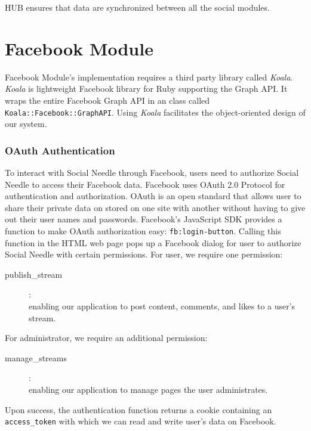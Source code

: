 HUB ensures that data are synchronized between all the social modules.


\section{Facebook Module} %
\label{sec:facebook_module}

Facebook Module's implementation requires a third party library called \emph{Koala}. \emph{Koala} is lightweight Facebook library for Ruby supporting the Graph API. It wraps the entire Facebook Graph API in an class called \texttt{Koala::Facebook::GraphAPI}. Using \emph{Koala} facilitates the object-oriented design of our system.

\subsubsection{OAuth Authentication} %
\label{ssub:oauth_authentication}

To interact with Social Needle through Facebook, users need to authorize Social Needle to access their Facebook data. Facebook uses OAuth 2.0 Protocol for authentication and authorization. OAuth is an open standard that allows user to share their private data on stored on one site with another without having to give out their user names and passwords. Facebook's JavaScript SDK provides a function to make OAuth authorization easy: \texttt{fb:login-button}. Calling this function in the HTML web page pops up a Facebook dialog for user to authorize Social Needle with certain permissions. For user, we require one permission: 
\begin{description}
	\item[publish\_stream]: \hfill \\
	enabling our application to post content, comments, and likes to a user's stream.
\end{description}
 For administrator, we require an additional permission: 
\begin{description}
	\item[manage\_streams]: \hfill \\
	enabling our application to manage pages the user administrates. 
\end{description} Upon success, the authentication function returns a cookie containing an \texttt{access\_token} with which we can read and write user's data on Facebook.


